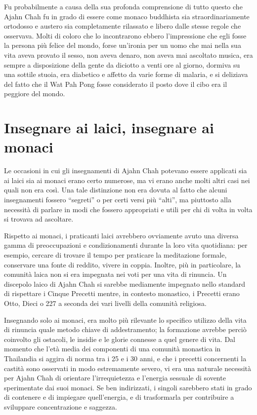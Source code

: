 Fu probabilmente a causa della sua profonda comprensione di tutto questo
che Ajahn Chah fu in grado di essere come monaco buddhista sia
straordinariamente ortodosso e austero sia completamente rilassato e
libero dalle stesse regole che osservava. Molti di coloro che lo
incontrarono ebbero l'impressione che egli fosse la persona più felice
del mondo, forse un'ironia per un uomo che mai nella sua vita aveva
provato il sesso, non aveva denaro, non aveva mai ascoltato musica, era
sempre a disposizione della gente da diciotto a venti ore al giorno,
dormiva su una sottile stuoia, era diabetico e affetto da varie forme di
malaria, e si deliziava del fatto che il Wat Pah Pong fosse considerato
il posto dove il cibo era il peggiore del mondo.

\section{Insegnare ai laici, insegnare ai monaci}

Le occasioni in cui gli insegnamenti di Ajahn Chah potevano essere
applicati sia ai laici sia ai monaci erano certo numerose, ma vi erano
anche molti altri casi nei quali non era così. Una tale distinzione non
era dovuta al fatto che alcuni insegnamenti fossero ``segreti'' o per
certi versi più ``alti'', ma piuttosto alla necessità di parlare in modi
che fossero appropriati e utili per chi di volta in volta si trovava ad
ascoltare.

Rispetto ai monaci, i praticanti laici avrebbero ovviamente avuto una
diversa gamma di preoccupazioni e condizionamenti durante la loro vita
quotidiana: per esempio, cercare di trovare il tempo per praticare la
meditazione formale, conservare una fonte di reddito, vivere in coppia.
Inoltre, più in particolare, la comunità laica non si era impegnata nei
voti per una vita di rinuncia. Un discepolo laico di Ajahn Chah si
sarebbe mediamente impegnato nello standard di rispettare i Cinque
Precetti mentre, in contesto monastico, i Precetti erano Otto, Dieci o
227 a seconda dei vari livelli della comunità religiosa.

Insegnando solo ai monaci, era molto più rilevante lo specifico utilizzo
della vita di rinuncia quale metodo chiave di addestramento; la
formazione avrebbe perciò coinvolto gli ostacoli, le insidie e le glorie
connesse a quel genere di vita. Dal momento che l'età media dei
componenti di una comunità monastica in Thailandia si aggira di norma
tra i 25 e i 30 anni, e che i precetti concernenti la castità sono
osservati in modo estremamente severo, vi era una naturale necessità per
Ajahn Chah di orientare l'irrequietezza e l'energia sessuale di sovente
sperimentate dai suoi monaci. Se ben indirizzati, i singoli sarebbero
stati in grado di contenere e di impiegare quell'energia, e di
trasformarla per contribuire a sviluppare concentrazione e saggezza.

